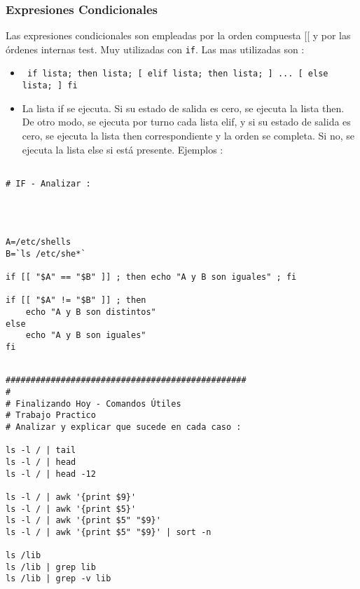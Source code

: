 \documentclass{beamer}
\begin{document}
\begin{frame}
\frametitle{Expresiones Condicionales}
Las expresiones condicionales son empleadas por la orden compuesta [[ y por las órdenes internas test. Muy utilizadas con \texttt{if}. Las mas utilizadas son :
 \begin{itemize}
\item \texttt{ if  lista;  then lista; [ elif lista; then lista; ] ... [ else lista; ] fi }
\item 
              La lista if se ejecuta. Si su estado de salida es cero, se  ejecuta  la  lista  then.  De  otro modo, se ejecuta por turno cada
              lista elif, y si su estado de salida  es  cero,  se  ejecuta  la
              lista  then  correspondiente  y  la orden se completa. Si no, se
              ejecuta la lista else si está presente. Ejemplos :\\

\end{itemize}
\end{frame}

\begin{Verbatim}

# IF - Analizar :




A=/etc/shells
B=`ls /etc/she*`

if [[ "$A" == "$B" ]] ; then echo "A y B son iguales" ; fi

if [[ "$A" != "$B" ]] ; then
	echo "A y B son distintos"
else
	echo "A y B son iguales"
fi

\end{Verbatim}




\begin{Verbatim}

################################################
#
# Finalizando Hoy - Comandos Útiles
# Trabajo Practico 
# Analizar y explicar que sucede en cada caso :

ls -l / | tail 
ls -l / | head 
ls -l / | head -12

ls -l / | awk '{print $9}'
ls -l / | awk '{print $5}'
ls -l / | awk '{print $5" "$9}'
ls -l / | awk '{print $5" "$9}' | sort -n

ls /lib
ls /lib | grep lib
ls /lib | grep -v lib
\end{Verbatim}
\end{document}
